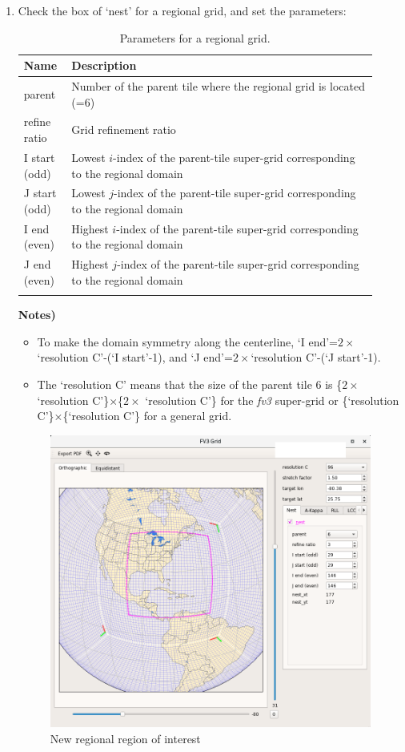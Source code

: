 \documentclass[11pt,fleqn]{report}              %
\begin{document}
\begin{enumerate}
\item Check the box of `nest' for a regional grid, and set the parameters:

{
\fontsize{10}{12}\selectfont
\begin{longtable}{p{0.12\linewidth} | p{0.8\linewidth} }
\hline
\hline
 Name & Description \\
\hline
 parent & Number of the parent tile where the regional grid is located (=6) \\
 refine ratio & Grid refinement ratio \\
 I start (odd) & Lowest $i$-index of the parent-tile super-grid corresponding to the regional domain\\
 J start (odd) & Lowest $j$-index of the parent-tile super-grid corresponding to the regional domain \\
 I end (even) & Highest $i$-index of the parent-tile super-grid corresponding to the regional domain \\
 J end (even) & Highest $j$-index of the parent-tile super-grid corresponding to the regional domain\\
\hline
\caption{Parameters for a regional grid.}
\label{table:fv3_var_child}
\end{longtable}
}

{\bf Notes)} 
\begin{itemize}
\item To make the domain symmetry along the centerline, `I end'=$2\times$`resolution C'-(`I start'-1), and `J end'=$2\times$`resolution C'-(`J start'-1).
\item The `resolution C' means that the size of the parent tile 6 is \{$2\times$`resolution C'\}$\times$\{$2\times$ `resolution C'\} for the {\it fv3} super-grid or \{`resolution C'\}$\times$\{`resolution C'\} for a general grid.
\end{itemize}

\begin{figure}[ht!]
  \centering
  \includegraphics[width=0.6\linewidth]{post_fv3grid_04.png}
  \caption{New regional region of interest}
  \label{fig:post_fv3grid_04}
\end{figure}

\end{enumerate}
\end{document}
